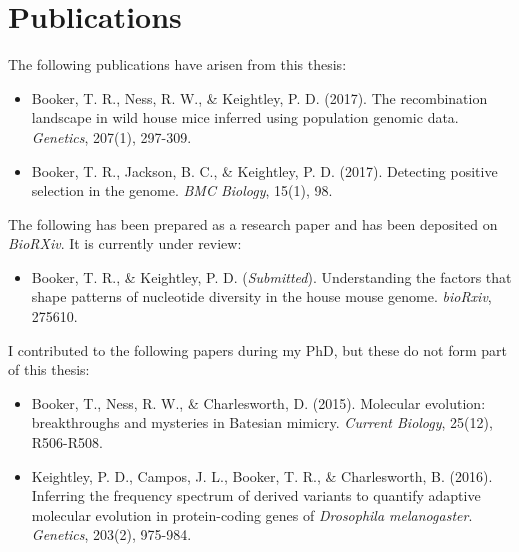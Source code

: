 \chapter{Publications}
\singlespacing
\noindent
The following publications have arisen from this thesis:
\begin{itemize}
\item Booker, T. R., Ness, R. W., \& Keightley, P. D. (2017). The recombination landscape in wild house mice inferred using population genomic data. \textit{Genetics}, 207(1), 297-309.
\item Booker, T. R., Jackson, B. C., \& Keightley, P. D. (2017). Detecting positive selection in the genome. \textit{BMC Biology}, 15(1), 98.
\end{itemize}
 
\noindent
The following has been prepared as a research paper and has been deposited on \textit{BioRXiv}. It is currently under review:
\begin{itemize}
\item Booker, T. R., \& Keightley, P. D. (\textit{Submitted}). Understanding the factors that shape patterns of nucleotide diversity in the house mouse genome. \textit{bioRxiv}, 275610.
\end{itemize}
 
\noindent
I contributed to the following papers during my PhD, but these do not form part of this thesis:
\begin{itemize}
\item Booker, T., Ness, R. W., \& Charlesworth, D. (2015). Molecular evolution: breakthroughs and mysteries in Batesian mimicry. \textit{Current Biology}, 25(12), R506-R508.
\item Keightley, P. D., Campos, J. L., Booker, T. R., \& Charlesworth, B. (2016). Inferring the frequency spectrum of derived variants to quantify adaptive molecular evolution in protein-coding genes of \textit{Drosophila melanogaster}. \textit{Genetics}, 203(2), 975-984.
\end{itemize}
  \doublespacing